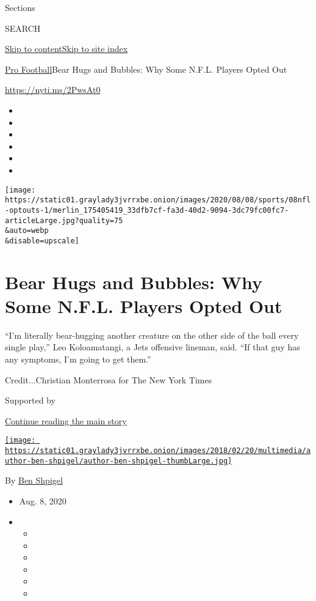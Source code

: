 Sections

SEARCH

\protect\hyperlink{site-content}{Skip to
content}\protect\hyperlink{site-index}{Skip to site index}

\href{/section/sports/football}{Pro Football}\textbar{}Bear Hugs and
Bubbles: Why Some N.F.L. Players Opted Out

\url{https://nyti.ms/2PwsAt0}

\begin{itemize}
\item
\item
\item
\item
\item
\item
\end{itemize}

\texttt{[image: https://static01.graylady3jvrrxbe.onion/images/2020/08/08/sports/08nfl-optouts-1/merlin\_175405419\_33dfb7cf-fa3d-40d2-9094-3dc79fc00fc7-articleLarge.jpg?quality=75\\\&auto=webp\\\&disable=upscale]}

\hypertarget{bear-hugs-and-bubbles-why-some-nfl-players-opted-out}{%
\section{Bear Hugs and Bubbles: Why Some N.F.L. Players Opted
Out}\label{bear-hugs-and-bubbles-why-some-nfl-players-opted-out}}

``I'm literally bear-hugging another creature on the other side of the
ball every single play,'' Leo Koloamatangi, a Jets offensive lineman,
said. ``If that guy has any symptoms, I'm going to get them.''

Credit...Christian Monterrosa for The New York Times

Supported by

\protect\hyperlink{after-sponsor}{Continue reading the main story}

\href{https://www.nytimes3xbfgragh.onion/by/ben-shpigel}{\texttt{[image: https://static01.graylady3jvrrxbe.onion/images/2018/02/20/multimedia/author-ben-shpigel/author-ben-shpigel-thumbLarge.jpg]}}

By \href{https://www.nytimes3xbfgragh.onion/by/ben-shpigel}{Ben Shpigel}

\begin{itemize}
\item
  Aug. 8, 2020
\item
  \begin{itemize}
  \item
  \item
  \item
  \item
  \item
  \item
  \end{itemize}
\end{itemize}

